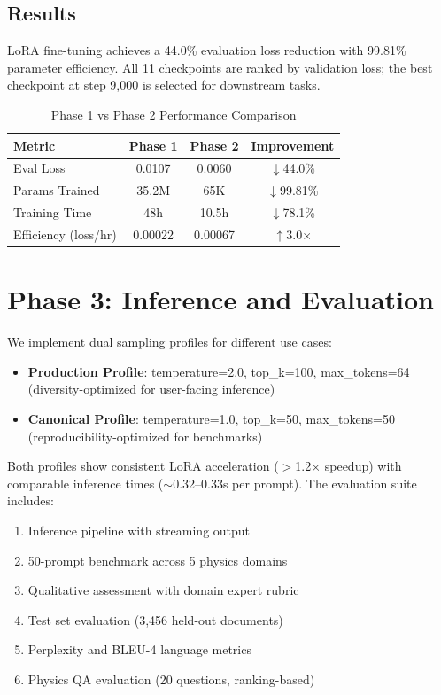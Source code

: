 \documentclass[11pt,a4paper]{article}
\begin{document}
\subsection{Results}

LoRA fine-tuning achieves a 44.0\% evaluation loss reduction with 99.81\% parameter efficiency. All 11 checkpoints are ranked by validation loss; the best checkpoint at step 9,000 is selected for downstream tasks.

\begin{table}[h]
\centering
\caption{Phase 1 vs Phase 2 Performance Comparison}
\begin{tabular}{lccc}
\toprule
\textbf{Metric} & \textbf{Phase 1} & \textbf{Phase 2} & \textbf{Improvement} \\
\midrule
Eval Loss & 0.0107 & 0.0060 & $\downarrow$44.0\% \\
Params Trained & 35.2M & 65K & $\downarrow$99.81\% \\
Training Time & 48h & 10.5h & $\downarrow$78.1\% \\
Efficiency (loss/hr) & 0.00022 & 0.00067 & $\uparrow$3.0$\times$ \\
\bottomrule
\end{tabular}
\end{table}

\section{Phase 3: Inference and Evaluation}

We implement dual sampling profiles for different use cases:

\begin{itemize}[leftmargin=*]
    \item \textbf{Production Profile}: temperature=2.0, top\_k=100, max\_tokens=64 (diversity-optimized for user-facing inference)
    \item \textbf{Canonical Profile}: temperature=1.0, top\_k=50, max\_tokens=50 (reproducibility-optimized for benchmarks)
\end{itemize}

Both profiles show consistent LoRA acceleration ($>$1.2$\times$ speedup) with comparable inference times ($\sim$0.32--0.33s per prompt). The evaluation suite includes:

\begin{enumerate}[leftmargin=*]
    \item Inference pipeline with streaming output
    \item 50-prompt benchmark across 5 physics domains
    \item Qualitative assessment with domain expert rubric
    \item Test set evaluation (3,456 held-out documents)
    \item Perplexity and BLEU-4 language metrics
    \item Physics QA evaluation (20 questions, ranking-based)
\end{enumerate}
\end{document}
